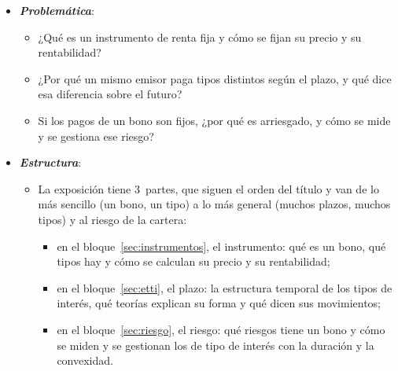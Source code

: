 \documentclass[11pt]{article}
\begin{document}
\begin{itemize}
\begin{itemize}
  \item \emph{Evolución}: desde los años 70, la liberalización de los movimientos de capital y la innovación financiera multiplicaron los títulos negociables (cédulas, titulizaciones, papel comercial) frente al préstamo y al depósito tradicionales; tras 2008, los Estados y los bancos centrales pasaron a ser los mayores emisores y compradores de bonos ; y hoy crecen los bonos verdes y los ligados a la sostenibilidad (anexo~\ref{anexo:verdes}).
  \end{itemize}

\item \textbf{\emph{Problemática}}:
  \begin{itemize}
  \item ¿Qué es un instrumento de renta fija y cómo se fijan su precio y su rentabilidad?
  \item ¿Por qué un mismo emisor paga tipos distintos según el plazo, y qué dice esa diferencia sobre el futuro?
  \item Si los pagos de un bono son fijos, ¿por qué es arriesgado, y cómo se mide y se gestiona ese riesgo?
  \end{itemize}

\item \textbf{\emph{Estructura}}:
  \begin{itemize}
  \item La exposición tiene 3~partes, que siguen el orden del título y van de lo más sencillo (un bono, un tipo) a lo más general (muchos plazos, muchos tipos) y al riesgo de la cartera:
    \begin{itemize}
    \item en el bloque~\ref{sec:instrumentos}, el instrumento: qué es un bono, qué tipos hay y cómo se calculan su precio y su rentabilidad;
    \item en el bloque~\ref{sec:etti}, el plazo: la estructura temporal de los tipos de interés, qué teorías explican su forma y qué dicen sus movimientos;
    \item en el bloque~\ref{sec:riesgo}, el riesgo: qué riesgos tiene un bono y cómo se miden y se gestionan los de tipo de interés con la duración y la convexidad.
    \end{itemize}
  \end{itemize}
\end{itemize}
\end{document}
